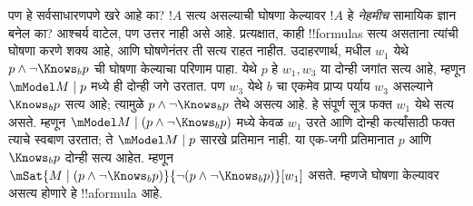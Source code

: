 \documentclass[../../../include/open-logic-section]{subfiles}
\begin{document}
पण हे सर्वसाधारणपणे खरे आहे का? $!A$ सत्य असल्याची
घोषणा केल्यावर $!A$ हे \emph{नेहमीच} सामायिक ज्ञान बनेल
का? आश्चर्य वाटेल, पण उत्तर नाही असे आहे. प्रत्यक्षात,
काही !!{formula}s सत्य असताना त्यांची घोषणा करणे
शक्य आहे, आणि घोषणेनंतर ती सत्य राहत नाहीत.
उदाहरणार्थ,  मधील
$w_1$ येथे $p \land \lnot \Knows_b p$ ची घोषणा
केल्याचा परिणाम पाहा. येथे $p$ हे $w_1,w_3$ या
दोन्ही जगांत सत्य आहे, म्हणून $\mModel M\mid p$ मध्ये
ही दोन्ही जगे उरतात. पण $w_3$ येथे $b$ चा एकमेव
प्राप्य पर्याय $w_3$ असल्याने $\Knows_b p$ सत्य आहे;
त्यामुळे $p\land\lnot\Knows_b p$ तेथे असत्य आहे.
हे संपूर्ण सूत्र फक्त $w_1$ येथे सत्य असते. म्हणून
$\mModel M\mid(p\land\lnot\Knows_b p)$ मध्ये केवळ
$w_1$ उरते आणि दोन्ही कर्त्यांसाठी फक्त त्याचे स्वबाण
उरतात; ते $\mModel M\mid p$ सारखे प्रतिमान नाही.
या एक-जगी प्रतिमानात $p$ आणि $\Knows_b p$ दोन्ही
सत्य आहेत. म्हणून
$\mSat{M \mid (p \land \lnot \Knows_b p)}{\lnot
(p \land \lnot \Knows_b p)}[w_1]$ असते. म्हणजे
घोषणा केल्यावर असत्य होणारे हे !!a{formula} आहे.
\end{document}
